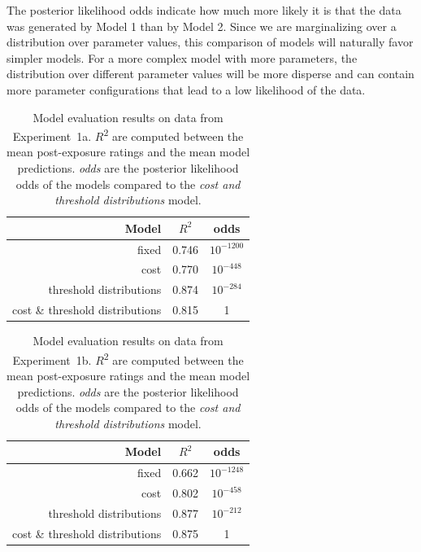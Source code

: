 \documentclass[lucida,biblatex]{sp} %
\begin{document}
\noindent The posterior likelihood odds indicate how much more likely it is that the data was generated by Model 1 than by Model 2. Since we are marginalizing over a distribution over parameter values, this comparison of models will naturally
favor simpler models. For a more complex model with more parameters, the distribution over different parameter values will be more disperse and can contain more parameter configurations that lead to a low likelihood of the data.

\begin{table}
\center
\begin{tabular}{r | c | c  }
Model & $R^2$ &   odds  \\ \midrule
fixed & 0.746 & $10^{-1200}$    \\
cost & 0.770 &  $10^{-448}$    \\
threshold distributions & 0.874 &  $10^{-284}$   \\
cost \& threshold distributions & 0.815 & 1 \\
\end{tabular}
\caption{Model evaluation results on data from Experiment~1a. $R$\textsuperscript{$2$} are computed between  the mean post-exposure ratings and the mean model predictions. \textit{odds} are the posterior likelihood odds of the models compared to the \textit{cost and threshold distributions} model. \label{tbl:model-comparison}}
\end{table}

\begin{table}
\center
\begin{tabular}{r | c | c }
Model & $R^2$ &   odds  \\ \midrule
fixed & 0.662 & $10^{-1248}$    \\
cost & 0.802 &  $10^{-458}$  \\
threshold distributions & 0.877 & $10^{-212}$  \\
cost \& threshold distributions & 0.875 & 1 \\
\end{tabular}
\caption{Model evaluation results on data from Experiment~1b.  $R$\textsuperscript{$2$} are computed between  the mean post-exposure ratings and the mean model predictions. \textit{odds} are the posterior likelihood odds of the models compared to the \textit{cost and threshold distributions} model.  \label{tbl:model-comparison-replication}}
\end{table}
\end{document}
